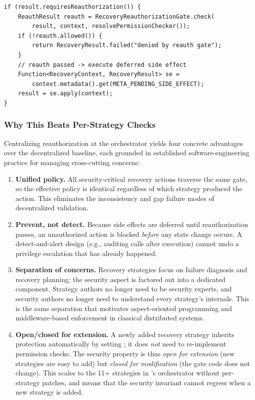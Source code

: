 \begin{lstlisting}[caption={\reauthgate{} in \code{RecoveryOrchestrator}: side effect deferred until reauth passes.},label={lst:reauthgate}]
if (result.requiresReauthorization()) {
    ReauthResult reauth = RecoveryReauthorizationGate.check(
        result, context, resolvePermissionChecker());
    if (!reauth.allowed()) {
        return RecoveryResult.failed("denied by reauth gate");
    }
    // reauth passed -> execute deferred side effect
    Function<RecoveryContext, RecoveryResult> se =
        context.metadata().get(META_PENDING_SIDE_EFFECT);
    result = se.apply(context);
}
\end{lstlisting}

\subsubsection{Why This Beats Per-Strategy Checks}
Centralizing reauthorization at the orchestrator yields four concrete advantages over the decentralized baseline, each grounded in established software-engineering practice for managing cross-cutting concerns:
\begin{enumerate}[leftmargin=*]
    \item \textbf{Unified policy.} All security-critical recovery actions traverse the same gate, so the effective policy is identical regardless of which strategy produced the action. This eliminates the inconsistency and gap failure modes of decentralized validation.
    \item \textbf{Prevent, not detect.} Because side effects are deferred until reauthorization passes, an unauthorized action is blocked \emph{before} any state change occurs. A detect-and-alert design (e.g., auditing  calls after execution) cannot undo a privilege escalation that has already happened.
    \item \textbf{Separation of concerns.} Recovery strategies focus on failure diagnosis and recovery planning; the security aspect is factored out into a dedicated component. Strategy authors no longer need to be security experts, and security authors no longer need to understand every strategy's internals. This is the same separation that motivates aspect-oriented programming and middleware-based enforcement in classical distributed systems.
    \item \textbf{Open/closed for extension.} A newly added recovery strategy inherits protection automatically by setting ; it does \emph{not} need to re-implement permission checks. The security property is thus \emph{open for extension} (new strategies are easy to add) but \emph{closed for modification} (the gate code does not change). This scales to the 11+ strategies in \system{}'s orchestrator without per-strategy patches, and means that the security invariant cannot regress when a new strategy is added.
\end{enumerate}

